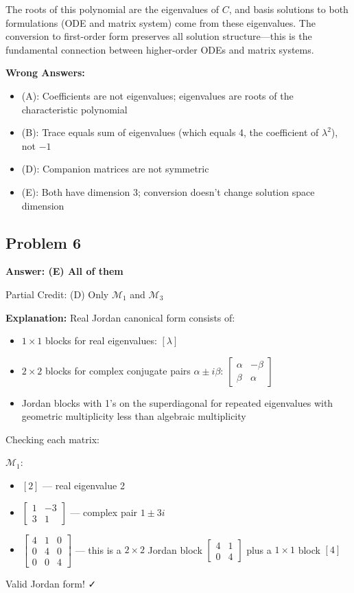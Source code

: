 \documentclass[12pt]{amsart}
\newcommand{\correct}[1]{{\color{correctgreen}\textbf{#1}}}
\newcommand{\partcred}[1]{{\color{partialblue}#1}}
\begin{document}
The roots of this polynomial are the eigenvalues of $C$, and basis solutions to both formulations (ODE and matrix system) come from these eigenvalues. The conversion to first-order form preserves all solution structure—this is the fundamental connection between higher-order ODEs and matrix systems.

\textbf{Wrong Answers:}
\begin{itemize}
\item (A): Coefficients are not eigenvalues; eigenvalues are roots of the characteristic polynomial
\item (B): Trace equals sum of eigenvalues (which equals 4, the coefficient of $\lambda^2$), not $-1$
\item (D): Companion matrices are not symmetric
\item (E): Both have dimension 3; conversion doesn't change solution space dimension
\end{itemize}

\subsection*{Problem 6}
\correct{Answer: (E) All of them}

\partcred{Partial Credit: (D) Only $\mathcal{M}_1$ and $\mathcal{M}_3$}

\textbf{Explanation:} Real Jordan canonical form consists of:
\begin{itemize}
\item $1 \times 1$ blocks for real eigenvalues: $[\lambda]$
\item $2 \times 2$ blocks for complex conjugate pairs $\alpha \pm i\beta$: $\begin{bmatrix} \alpha & -\beta \\ \beta & \alpha \end{bmatrix}$
\item Jordan blocks with 1's on the superdiagonal for repeated eigenvalues with geometric multiplicity less than algebraic multiplicity
\end{itemize}

Checking each matrix:

\textbf{$\mathcal{M}_1$}: 
\begin{itemize}
\item $[2]$ — real eigenvalue 2
\item $\begin{bmatrix} 1 & -3 \\ 3 & 1 \end{bmatrix}$ — complex pair $1 \pm 3i$
\item $\begin{bmatrix} 4 & 1 & 0 \\ 0 & 4 & 0 \\ 0 & 0 & 4 \end{bmatrix}$ — this is a $2 \times 2$ Jordan block $\begin{bmatrix} 4 & 1 \\ 0 & 4 \end{bmatrix}$ plus a $1 \times 1$ block $[4]$
\end{itemize}
Valid Jordan form! ✓
\end{document}
